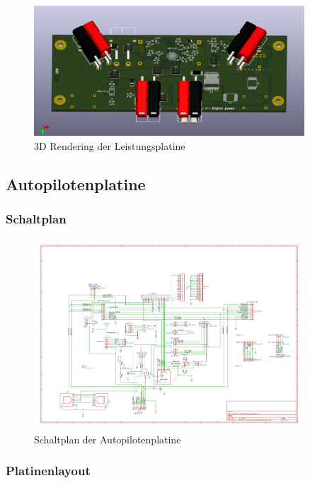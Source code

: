 \begin{figure}[H]
\centering
\includegraphics[width=0.9\textwidth]{bilder/Centerbox/Centerbox-Front-Power_AUVSI_2016_rev-01-3D.png} 
\caption{3D Rendering der Leistungsplatine} 
\label{fig:3D Rendering der Leistungsplatine}
\end{figure}

\subsection{Autopilotenplatine}

\subsubsection{Schaltplan}

\begin{figure}[H]
\centering
\includegraphics[width=0.9\textwidth]{bilder/Centerbox/Centerbox-Rear-Pixhawk_AUVSI16.pdf} 
\caption{Schaltplan der Autopilotenplatine} 
\label{fig:Schaltplan der Autopilotenplatine}
\end{figure}

\subsubsection{Platinenlayout}

